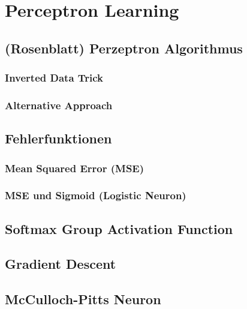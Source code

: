 \section*{Perceptron Learning}
\subsection*{(Rosenblatt) Perzeptron Algorithmus}



\subsubsection*{Inverted Data Trick}

\subsubsection*{Alternative Approach}

\subsection*{Fehlerfunktionen}
\subsubsection*{Mean Squared Error (MSE)}
\subsubsection*{MSE und Sigmoid (Logistic Neuron)}

\subsection*{Softmax Group Activation Function}

\subsection*{Gradient Descent}

\subsection*{McCulloch-Pitts Neuron}
